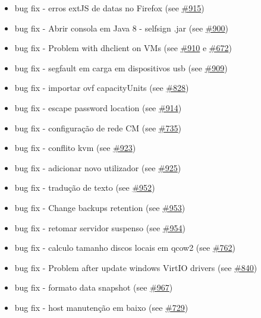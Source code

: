 \begin{itemize}
    \item bug fix - erros extJS de datas no Firefox (see \href{https://srcmaster.eurotux.com/pm/p/etva/ticket/915}{\#915})
    \item bug fix - Abrir consola em Java 8 - selfsign .jar (see \href{https://srcmaster.eurotux.com/pm/p/etva/ticket/900}{\#900})
    \item bug fix - Problem with dhclient on VMs (see \href{https://srcmaster.eurotux.com/pm/p/etva/ticket/910}{\#910} e \href{https://srcmaster.eurotux.com/pm/p/etva/ticket/672}{\#672})
    \item bug fix - segfault em carga em dispositivos usb (see \href{https://srcmaster.eurotux.com/pm/p/etva/ticket/909}{\#909})
    \item bug fix - importar ovf capacityUnits (see \href{https://srcmaster.eurotux.com/pm/p/etva/ticket/828}{\#828})
    \item bug fix - escape password location (see \href{https://srcmaster.eurotux.com/pm/p/etva/ticket/914}{\#914})
    \item bug fix - configuração de rede CM (see \href{https://srcmaster.eurotux.com/pm/p/etva/ticket/735}{\#735})
    \item bug fix - conflito kvm (see \href{https://srcmaster.eurotux.com/pm/p/etva/ticket/923}{\#923})
    \item bug fix - adicionar novo utilizador (see \href{https://srcmaster.eurotux.com/pm/p/etva/ticket/925}{\#925})
    \item bug fix - tradução de texto (see \href{https://srcmaster.eurotux.com/pm/p/etva/ticket/952}{\#952})
    \item bug fix - Change backups retention (see \href{https://srcmaster.eurotux.com/pm/p/etva/ticket/953}{\#953})
    \item bug fix - retomar servidor suspenso (see \href{https://srcmaster.eurotux.com/pm/p/etva/ticket/954}{\#954})
    \item bug fix - calculo tamanho discos locais em qcow2 (see \href{https://srcmaster.eurotux.com/pm/p/etva/ticket/762}{\#762})
    \item bug fix - Problem after update windows VirtIO drivers (see \href{https://srcmaster.eurotux.com/pm/p/etva/ticket/840}{\#840})
    \item bug fix - formato data snapshot (see \href{https://srcmaster.eurotux.com/pm/p/etva/ticket/967}{\#967})
    \item bug fix - host manutenção em baixo (see \href{https://srcmaster.eurotux.com/pm/p/etva/ticket/729}{\#729})

\end{itemize}
